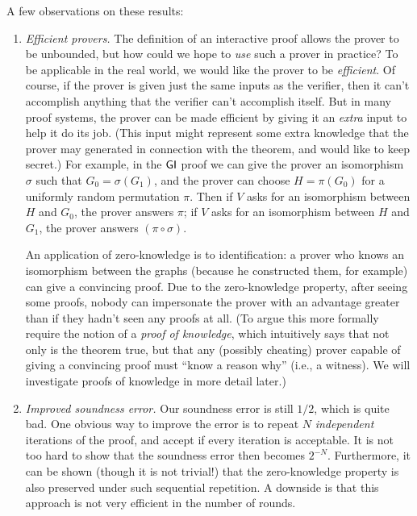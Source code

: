 \documentclass[11pt]{article}
\begin{document}
A few observations on these results:
\begin{enumerate}
\item \emph{Efficient provers.}  The definition of an interactive
  proof allows the prover to be unbounded, but how could we hope to
  \emph{use} such a prover in practice?  To be applicable in the real
  world, we would like the prover to be \emph{efficient}.  Of course,
  if the prover is given just the same inputs as the verifier, then it
  can't accomplish anything that the verifier can't accomplish itself.
  But in many proof systems, the prover can be made efficient by
  giving it an \emph{extra} input to help it do its job.  (This input
  might represent some extra knowledge that the prover may generated
  in connection with the theorem, and would like to keep secret.)  For
  example, in the $\mathsf{GI}$ proof we can give the prover an isomorphism
  $\sigma$ such that $G_{0} = \sigma(G_{1})$, and the prover can
  choose $H = \pi(G_{0})$ for a uniformly random permutation $\pi$.
  Then if $V$ asks for an isomorphism between $H$ and $G_0$, the
  prover answers $\pi$; if $V$ asks for an isomorphism between $H$ and
  $G_1$, the prover answers $(\pi \circ \sigma)$.

  An application of zero-knowledge is to identification: a prover who
  knows an isomorphism between the graphs (because he constructed
  them, for example) can give a convincing proof.  Due to the
  zero-knowledge property, after seeing some proofs, nobody can
  impersonate the prover with an advantage greater than if they hadn't
  seen any proofs at all.  (To argue this more formally require the
  notion of a \emph{proof of knowledge}, which intuitively says that
  not only is the theorem true, but that any (possibly cheating)
  prover capable of giving a convincing proof must ``know a reason why''
  (i.e., a witness).  We will investigate proofs of knowledge in more
  detail later.)

\item \emph{Improved soundness error.}  Our soundness error is still
  $1/2$, which is quite bad.  One obvious way to improve the error is
  to repeat $N$ \emph{independent} iterations of the proof, and accept
  if every iteration is acceptable.  It is not too hard to show that
  the soundness error then becomes $2^{-N}$.  Furthermore, it can be
  shown (though it is not trivial!)  that the zero-knowledge property
  is also preserved under such sequential repetition.  A downside is
  that this approach is not very efficient in the number of rounds.


\end{enumerate}
\end{document}
